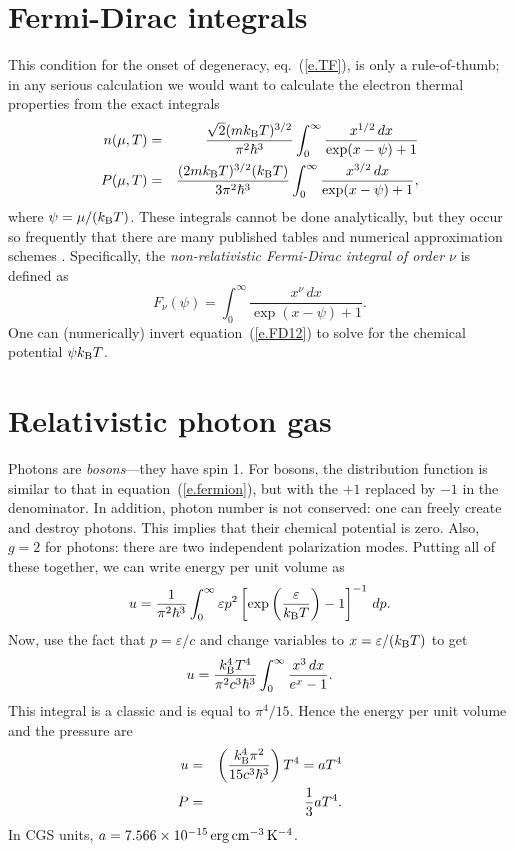 \section{Fermi-Dirac integrals}
This condition for the onset of degeneracy, eq.~(\ref{e.TF}), is only a rule-of-thumb; in any serious calculation we would want to calculate the electron thermal properties from the exact integrals
\begin{eqnarray}\label{e.FD12}
n(\mu,T) &=& \frac{\sqrt{2}(mk_\mathrm{B} T)^{3/2}}{\pi^{2}\hbar^{3}}\int_{0}^{\infty} \frac{x^{1/2}\,dx}{\exp(x-\psi)+1} \\
P(\mu,T) &=& \frac{(2mk_\mathrm{B} T)^{3/2}(k_\mathrm{B} T)}{3\pi^{2}\hbar^{3}}\int_{0}^{\infty} \frac{x^{3/2}\,dx}{\exp(x-\psi)+1},
\end{eqnarray}
where $\psi = \mu/(k_\mathrm{B} T)$.  These integrals cannot be done analytically, but they occur so frequently that there are many published tables and numerical approximation schemes \citep[see][]{timmes.swesty:accuracy}.  Specifically, the \emph{non-relativistic Fermi-Dirac integral of order $\nu$} is defined as
\begin{equation}\label{e.FDintegral}
F_{\nu}(\psi) = \int_{0}^{\infty}\frac{ x^{\nu}\,dx}{\exp(x-\psi)+1}.
\end{equation}
One can (numerically) invert equation~(\ref{e.FD12}) to solve for the chemical potential $\psi k_\mathrm{B} T$.

\section{Relativistic photon gas}
Photons are \emph{bosons}---they have spin 1. For bosons, the distribution function is similar to that in equation~(\ref{e.fermion}), but with the $+1$ replaced by $-1$ in the denominator. In addition, photon number is not conserved: one can freely create and destroy photons.  This implies that their chemical potential is zero.  Also, $g=2$ for photons: there are two independent polarization modes. Putting all of these together, we can write energy per unit volume as
\begin{equation}\label{e.boson-dist}
u = \frac{1}{\pi^{2}\hbar^{3}}\int_{0}^{\infty}\varepsilon p^{2}\left[\exp\left(\frac{\varepsilon}{k_\mathrm{B} T}\right)-1\right]^{-1}\,dp.
\end{equation}
Now, use the fact that $p = \varepsilon/c$ and change variables to $x = \varepsilon/(k_\mathrm{B} T)$ to get
\[
 u = \frac{k_\mathrm{B} ^{4}T^{4}}{\pi^{2}c^{3}\hbar^{3}}\int_{0}^{\infty} \frac{x^{3}\,dx}{e^{x}-1}.
\]
This integral is a classic and is equal to $\pi^{4}/15$.  Hence the energy per unit volume and the pressure are
\begin{eqnarray}\label{e.radiation-eos}
u &=& \left(\frac{k_\mathrm{B} ^{4}\pi^{2}}{15 c^{3}\hbar^{3}} \right) T^{4} = aT^{4}\\
P &=& \frac{1}{3} aT^{4}.
\end{eqnarray}
In CGS units, $a = 7.566\times 10^{-15}\,\mathrm{erg}\,\mathrm{c}\mathrm{m}^{-3}\,\mathrm{K}^{-4}$.

